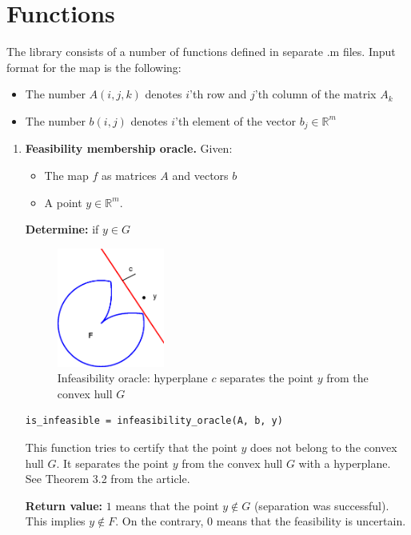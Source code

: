\documentclass[a4paper]{article}
\theoremstyle{definition}
\begin{document}
\section{Functions}
The library consists of a number of functions defined in separate .m files. Input format for the map is the following: 

\begin{itemize}
\item The number $A(i, j, k)$ denotes $i$'th row and $j$'th column of the matrix $A_k$
\item The number $b(i, j)$ denotes $i$'th element of the vector $b_j\in\mathbb{R}^m$
\end{itemize}

\begin{enumerate}
\item {\bf Feasibility membership oracle.} Given:
\begin{itemize}
\item The map $f$ as matrices $A$ and vectors $b$
\item A point $y\in\mathbb{R}^m$.
\end{itemize}
{\bf Determine:} if $y\in G$

\begin{figure}[H]
	\centering\includegraphics[width=100pt]{fig/infeasibility_oracle}
	\caption{Infeasibility oracle: hyperplane $c$ separates the point $y$ from the convex hull $G$}
\end{figure}

\begin{verbatim}
is_infeasible = infeasibility_oracle(A, b, y)
\end{verbatim}

This function tries to certify that the point $y$ does not belong to the convex hull $G$. It separates the point $y$ from the convex hull $G$ with a hyperplane. See Theorem 3.2 from the article.

{\bf Return value:} $1$ means that the point $y\notin G$ (separation was successful). This implies $y\notin F$. On the contrary, $0$ means that the feasibility is uncertain.


\end{enumerate}
\end{document}
